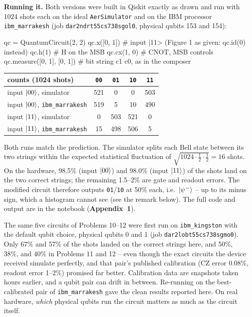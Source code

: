 \documentclass[a4paper, 10pt]{article}
\begin{document}
\begin{solution}
	\noindent \textbf{Running it.} Both versions were built in Qiskit exactly as drawn and run with 1024 shots each on the ideal \texttt{AerSimulator} and on the IBM processor \texttt{ibm\_marrakesh} (job \texttt{dar2ndrt55cs738sgol0}, physical qubits 153 and 154):
	\begin{codingbox*}
qc = QuantumCircuit(2, 2)
qc.x([0, 1])                  # input |11>   (Figure 1 as given: qc.id(0) instead)
qc.h(1)                       # H on the MSB
qc.cx(1, 0)                   # CNOT, MSB controls
qc.measure([0, 1], [0, 1])    # bit string c1 c0, as in the composer
\end{codingbox*}
	\begin{center}
		\begin{tabular}{lcccc}
			\toprule
			counts (1024 shots)                           & \texttt{00} & \texttt{01} & \texttt{10} & \texttt{11} \\
			\midrule
			input \( \ket{00} \), simulator               & 521         & 0           & 0           & 503         \\
			input \( \ket{00} \), \texttt{ibm\_marrakesh} & 519         & 5           & 10          & 490         \\
			input \( \ket{11} \), simulator               & 0           & 503         & 521         & 0           \\
			input \( \ket{11} \), \texttt{ibm\_marrakesh} & 15          & 498         & 506         & 5           \\
			\bottomrule
		\end{tabular}
	\end{center}
	\noindent Both runs match the prediction. The simulator splits each Bell state between its two strings within the expected statistical fluctuation of \( \sqrt{1024 \cdot \tfrac{1}{2} \cdot \tfrac{1}{2}} = 16 \) shots.
	On the hardware, 98.5\% (input \( \ket{00} \)) and 98.0\% (input \( \ket{11} \)) of the shots land on the two correct strings; the remaining 1.5--2\% are gate and readout errors.
	The modified circuit therefore outputs \texttt{01}/\texttt{10} at 50\% each, i.e.\ \( \ket{\psi^{-}} \) -- up to its minus sign, which a histogram cannot see (see the remark below).
	The full code and output are in the notebook (\textbf{Appendix~1}).

	\begin{remark}
		The same five circuits of Problems 10--12 were first run on \texttt{ibm\_kingston} with the default qubit choice, physical qubits 0 and 1 (job \texttt{dar2lobt55cs738sgmo0}).
		Only 67\% and 57\% of the shots landed on the correct strings here, and 50\%, 38\%, and 40\% in Problems 11 and 12 -- even though the exact circuits the device received simulate perfectly, and that pair's published calibration (CZ error 0.08\%, readout error 1--2\%) promised far better.
		Calibration data are snapshots taken hours earlier, and a qubit pair can drift in between.
		Re-running on the best-calibrated pair of \texttt{ibm\_marrakesh} gave the clean results reported here. On real hardware, \emph{which} physical qubits run the circuit matters as much as the circuit itself.
	\end{remark}


\end{solution}
\end{document}
